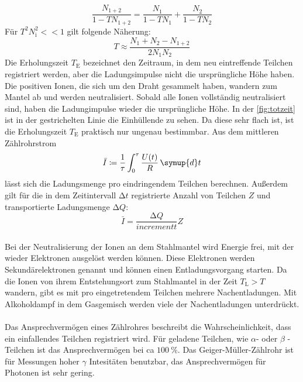 \begin{equation*}
    \frac{N_{1+2}}{1-TN_{1+2}} = \frac{N_1}{1-TN_1}+\frac{N_2}{1-TN_2}
\end{equation*}
Für $T^2N_{\text{i}}^2 <<1$ gilt folgende Näherung:
\begin{equation}\label{eqn:totzeit}
    T \approx \frac{N_1 + N_2 - N_{1+2}}{2N_1N_2}
\end{equation}
Die Erholungszeit $T_{\text{E}}$ bezeichnet den Zeitraum, in dem neu eintreffende Teilchen registriert werden, aber die Ladungsimpulse nicht die ursprüngliche Höhe haben.
Die positiven Ionen, die sich um den Draht gesammelt haben, wandern zum Mantel ab und werden neutralisiert.
Sobald alle Ionen vollständig neutralisiert sind, haben die Ladungimpulse wieder die ursprüngliche Höhe.
In der \autoref{fig:totzeit} ist in der gestrichelten Linie die Einhüllende zu sehen.
Da diese sehr flach ist, ist die Erholungszeit $T_{\text{E}}$ praktisch nur ungenau bestimmbar.
Aus dem mittleren Zählrohrstrom 
 \begin{equation*}
     \bar{I} \coloneq \frac{1}{\tau} \int_0^{\tau} \frac{U(t)}{R}\,\symup{d}t
 \end{equation*} 
 lässt sich die Ladungsmenge pro eindringendem Teilchen berechnen.
 Außerdem gilt für die in dem Zeitintervall $\increment t$ registrierte Anzahl von Teilchen $Z$ und transportierte Ladungsmenge $\increment Q$:
 \begin{equation}\label{eqn:Ladung}
     \bar{I} = \frac{\increment Q}{increment t} Z
 \end{equation}\\
Bei der Neutralisierung der Ionen an dem Stahlmantel wird Energie frei, mit der wieder Elektronen ausgelöst werden können.
Diese Elektronen werden Sekundärelektronen genannt und können einen Entladungsvorgang starten.
Da die Ionen von ihrem Entstehungsort zum Stahlmantel in der Zeit $T_{\text{L}}>T$ wandern, gibt es mit pro eingetretendem Teilchen mehrere Nachentladungen.
Mit Alkoholdampf in dem Gasgemisch werden viele der Nachentladungen unterdrückt.\\
\\
Das Ansprechvermögen eines Zählrohres beschreibt die Wahrscheinlichkeit, dass ein einfallendes Teilchen registriert wird.
Für geladene Teilchen, wie $\alpha$- oder $\beta $ -Teilchen ist das Ansprechvermögen bei ca $\SI{100}{\percent}$.
Das Geiger-Müller-Zählrohr ist für Messungen hoher $\gamma$ Intesitäten benutzbar, das Ansprechvermögen für Photonen ist sehr gering.\\
